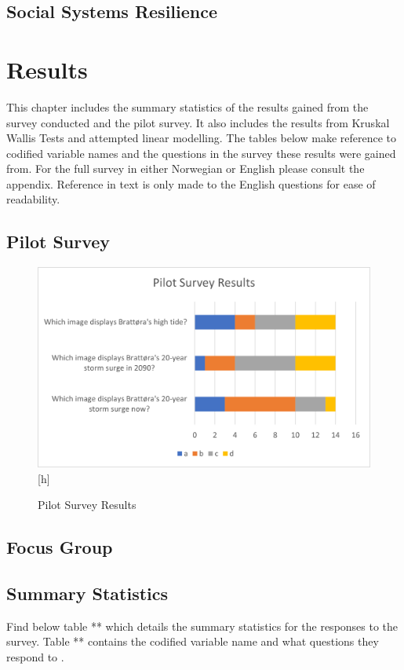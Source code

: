 \section{Social Systems Resilience}

\chapter{Results}
This chapter includes the summary statistics of the results gained from the survey conducted and the pilot survey. It also includes the results from Kruskal Wallis Tests and attempted linear modelling. The tables below make reference to codified variable names and the questions in the survey these results were gained from. For the full survey in either Norwegian or English please consult the appendix. Reference in text is only made to the English questions for ease of readability. 

\section{Pilot Survey}

\begin{figure}
    \centering
    \includegraphics{fig_results/pilot-survey-results.png}[h]
    \caption{Pilot Survey Results}
    \label{fig:my_label}
\end{figure}

\section{Focus Group}

\section{Summary Statistics }
Find below table ** which details the summary statistics for the responses to the survey. Table ** contains the codified variable name and what questions they respond to .



